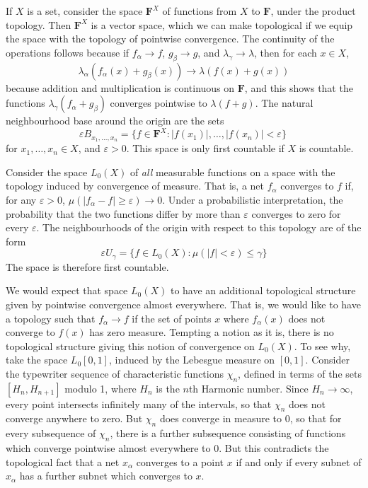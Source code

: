 \begin{example}
    If $X$ is a set, consider the space $\mathbf{F}^X$ of functions from $X$ to $\mathbf{F}$, under the product topology. Then $\mathbf{F}^X$ is a vector space, which we can make topological if we equip the space with the topology of pointwise convergence. The continuity of the operations follows because if $f_\alpha \to f$, $g_\beta \to g$, and $\lambda_\gamma \to \lambda$, then for each $x \in X$,
    \[ \lambda_\alpha (f_\alpha(x) + g_\beta(x)) \to \lambda( f(x) + g(x)) \]
    because addition and multiplication is continuous on $\mathbf{F}$, and this shows that the functions $\lambda_\gamma (f_\alpha + g_\beta)$ converges pointwise to $\lambda(f + g)$. The natural neighbourhood base around the origin are the sets
    \[ \varepsilon B_{x_1, \dots, x_n} = \{ f \in \mathbf{F}^X : |f(x_1)|, \dots, |f(x_n)| < \varepsilon \}\ \]
    for $x_1, \dots, x_n \in X$, and $\varepsilon > 0$. This space is only first countable if $X$ is countable.
\end{example}

\begin{example}
    Consider the space $L_0(X)$ of {\it all} measurable functions on a space with the topology induced by convergence of measure. That is, a net $f_\alpha$ converges to $f$ if, for any $\varepsilon > 0$, $\mu ( |f_\alpha - f| \geq \varepsilon ) \to 0$. Under a probabilistic interpretation, the probability that the two functions differ by more than $\varepsilon$ converges to zero for every $\varepsilon$. The neighbourhoods of the origin with respect to this topology are of the form
    \[ \varepsilon U_\gamma = \{ f \in L_0(X): \mu(|f| < \varepsilon) \leq \gamma \} \]
    The space is therefore first countable.
\end{example}

\begin{example}
    We would expect that space $L_0(X)$ to have an additional topological structure given by pointwise convergence almost everywhere. That is, we would like to have a topology such that $f_\alpha \to f$ if the set of points $x$ where $f_\alpha(x)$ does not converge to $f(x)$ has zero measure. Tempting a notion as it is, there is no topological structure giving this notion of convergence on $L_0(X)$. To see why, take the space $L_0[0,1]$, induced by the Lebesgue measure on $[0,1]$. Consider the typewriter sequence of characteristic functions $\chi_n$, defined in terms of the sets $[H_n, H_{n+1}]$ modulo 1, where $H_n$ is the $n$th Harmonic number. Since $H_n \to \infty$, every point intersects infinitely many of the intervals, so that $\chi_n$ does not converge anywhere to zero. But $\chi_n$ does converge in measure to 0, so that for every subsequence of $\chi_n$, there is a further subsequence consisting of functions which converge pointwise almost everywhere to 0. But this contradicts the topological fact that a net $x_\alpha$ converges to a point $x$ if and only if every subnet of $x_\alpha$ has a further subnet which converges to $x$.
\end{example}


